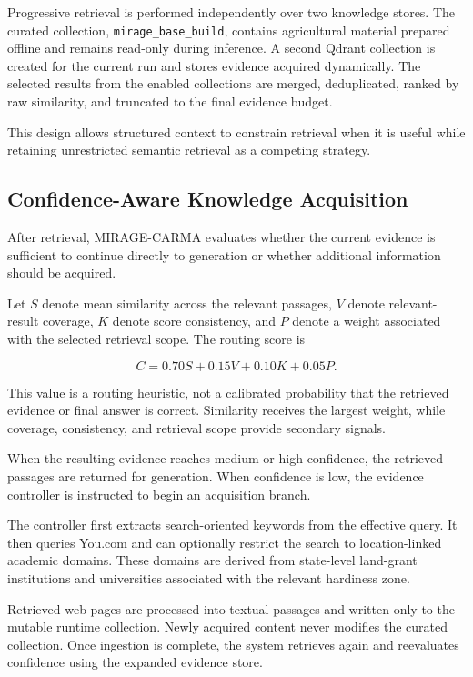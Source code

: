 \documentclass[runningheads]{llncs}
\begin{document}
Progressive retrieval is performed independently over two knowledge stores. The curated collection, \texttt{mirage\_base\_build}, contains agricultural material prepared offline and remains read-only during inference. A second Qdrant collection is created for the current run and stores evidence acquired dynamically. The selected results from the enabled collections are merged, deduplicated, ranked by raw similarity, and truncated to the final evidence budget.

This design allows structured context to constrain retrieval when it is useful while retaining unrestricted semantic retrieval as a competing strategy.

\subsection{Confidence-Aware Knowledge Acquisition}

After retrieval, MIRAGE-CARMA evaluates whether the current evidence is sufficient to continue directly to generation or whether additional information should be acquired.

Let \(S\) denote mean similarity across the relevant passages, \(V\) denote relevant-result coverage, \(K\) denote score consistency, and \(P\) denote a weight associated with the selected retrieval scope. The routing score is

\begin{equation}
C
=
0.70S
+
0.15V
+
0.10K
+
0.05P.
\label{eq:confidence}
\end{equation}

This value is a routing heuristic, not a calibrated probability that the retrieved evidence or final answer is correct. Similarity receives the largest weight, while coverage, consistency, and retrieval scope provide secondary signals.

When the resulting evidence reaches medium or high confidence, the retrieved passages are returned for generation. When confidence is low, the evidence controller is instructed to begin an acquisition branch.

The controller first extracts search-oriented keywords from the effective query. It then queries You.com and can optionally restrict the search to location-linked academic domains. These domains are derived from state-level land-grant institutions and universities associated with the relevant hardiness zone.

Retrieved web pages are processed into textual passages and written only to the mutable runtime collection. Newly acquired content never modifies the curated collection. Once ingestion is complete, the system retrieves again and reevaluates confidence using the expanded evidence store.
\end{document}
